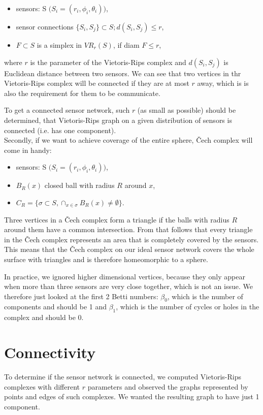 \documentclass[a4paper, 12pt]{article}
\begin{document}
\begin{itemize}
	\item {sensors: S $\big(S_i = (r_i, \phi_i, \theta_i)\big)$,}
	\item {sensor connections $\{S_i, S_j\} \subset S; d(S_i, S_j) \leq r$,}
	\item {$F \subset S$ is a simplex in $VR_r(S)$, if diam $F \leq r$,}
\end{itemize} 
where $r$ is the parameter of the Vietoris-Rips complex and $d(S_i, S_j)$ is Euclidean distance between two sensors. We can see that two vertices in thr Vietoris-Rips complex will be connected if they are at most $r$ away, which is is also the requirement for them to be communicate. 

To get a connected sensor network, such $r$ (as small as possible) should be determined, that Vietoris-Rips graph on a given distribution of sensors is connected (i.e. has one component).
\\

Secondly, if we want to achieve coverage of the entire sphere, Čech complex will come in handy:

\begin{itemize}
	\item {sensors: S $\big(S_i = (r_i, \phi_i, \theta_i)\big)$,}
	\item {$B_R(x)$ closed ball with radius $R$ around $x$,}
	\item {$C_R = \{\sigma \subset S,\cap_{x\in \sigma}B_R(x) \neq \emptyset \}$.
	}
\end{itemize}

 Three vertices in a Čech complex form a triangle if the balls with radius $R$ around them have a common intersection. From that follows that every triangle in the Čech complex represents an area that is completely covered by the sensors. This means that the \v Cech complex on our ideal sensor network covers the whole surface with triangles and is therefore homeomorphic to a sphere. 

In practice, we ignored higher dimensional vertices, because they only appear when more than three sensors are very close together, which is not an issue. We therefore just looked at the first 2 Betti numbers: $\beta_0$, which is the number of components and should be 1 and $\beta_1$, which is the number of cycles or holes in the complex and should be 0.

\clearpage

\section{Connectivity}
To determine if the sensor network is connected, we computed Vietoris-Rips complexes with different $r$ parameters and observed the graphs represented by points and edges of such complexes. We wanted the resulting graph to have just 1 component.
\end{document}
